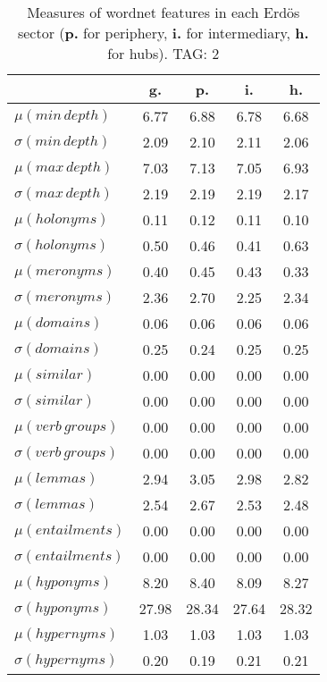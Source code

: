 \begin{table}[h!]
\begin{center}
\begin{tabular}{| l | c | c | c | c |}\hline
 & g. & p. & i. & h. \\\hline
$\mu(min\,depth)$ & 6.77  & 6.88  & 6.78  & 6.68 \\\hline
$\sigma(min\,depth)$ & 2.09  & 2.10  & 2.11  & 2.06 \\\hline
$\mu(max\,depth)$ & 7.03  & 7.13  & 7.05  & 6.93 \\\hline
$\sigma(max\,depth)$ & 2.19  & 2.19  & 2.19  & 2.17 \\\hline
$\mu(holonyms)$ & 0.11  & 0.12  & 0.11  & 0.10 \\\hline
$\sigma(holonyms)$ & 0.50  & 0.46  & 0.41  & 0.63 \\\hline
$\mu(meronyms)$ & 0.40  & 0.45  & 0.43  & 0.33 \\\hline
$\sigma(meronyms)$ & 2.36  & 2.70  & 2.25  & 2.34 \\\hline
$\mu(domains)$ & 0.06  & 0.06  & 0.06  & 0.06 \\\hline
$\sigma(domains)$ & 0.25  & 0.24  & 0.25  & 0.25 \\\hline
$\mu(similar)$ & 0.00  & 0.00  & 0.00  & 0.00 \\\hline
$\sigma(similar)$ & 0.00  & 0.00  & 0.00  & 0.00 \\\hline
$\mu(verb\,groups)$ & 0.00  & 0.00  & 0.00  & 0.00 \\\hline
$\sigma(verb\,groups)$ & 0.00  & 0.00  & 0.00  & 0.00 \\\hline
$\mu(lemmas)$ & 2.94  & 3.05  & 2.98  & 2.82 \\\hline
$\sigma(lemmas)$ & 2.54  & 2.67  & 2.53  & 2.48 \\\hline
$\mu(entailments)$ & 0.00  & 0.00  & 0.00  & 0.00 \\\hline
$\sigma(entailments)$ & 0.00  & 0.00  & 0.00  & 0.00 \\\hline
$\mu(hyponyms)$ & 8.20  & 8.40  & 8.09  & 8.27 \\\hline
$\sigma(hyponyms)$ & 27.98  & 28.34  & 27.64  & 28.32 \\\hline
$\mu(hypernyms)$ & 1.03  & 1.03  & 1.03  & 1.03 \\\hline
$\sigma(hypernyms)$ & 0.20  & 0.19  & 0.21  & 0.21 \\\hline
\end{tabular}
\caption{Measures of wordnet features in each Erd\"os sector ({{\bf p.}} for periphery, {{\bf i.}} for intermediary, {{\bf h.}} for hubs). TAG: 2}
\end{center}
\end{table}